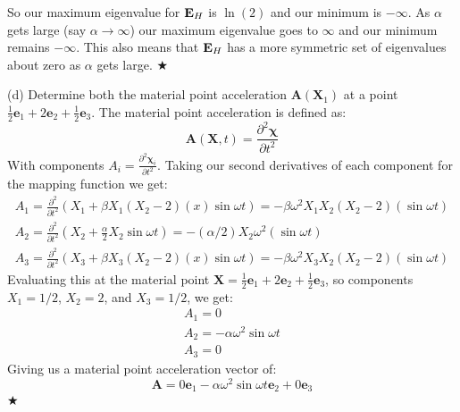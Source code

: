 So our maximum eigenvalue for $\mathbf{E}_H$ is $\ln(2)$ and our minimum is $-\infty$. As $\alpha$ gets large (say $\alpha \to \infty$) our maximum eigenvalue goes to $\infty$ and our minimum remains $-\infty$. This also means that $\mathbf{E}_H$ has a more symmetric set of eigenvalues about zero as $\alpha$ gets large.
\hspace*{\fill} $\bigstar$

\medskip
(d) Determine both the material point acceleration $\bm{A}(\bm{X}_1)$ at a point $\frac{1}{2} \bm{e}_1 + 2\bm{e}_2 + \frac{1}{2} \bm{e}_3$.  
The material point acceleration is defined as:
\begin{equation}
    \bm{A}(\bm{X},t) = \frac{\partial^2 \bm{\chi}}{\partial t^2}
\end{equation}
With components $A_i = \frac{\partial^2 \bm{\chi}_i}{\partial t^2}$.
Taking our second derivatives of each component for the mapping function we get:
\begin{equation}
\begin{split}
    A_1 = \frac{\partial^2}{\partial t^2} (X_1 + \beta X_1(X_2 - 2)(x)\sin{\omega t}) = -\beta \omega^2 X_1X_2(X_2-2)(\sin{\omega t}) \\
    A_2 = \frac{\partial^2}{\partial t^2} (X_2 + \frac{\alpha}{2}X_2 \sin{\omega t}) = -(\alpha /2)X_2\omega^2(\sin{\omega t}) \\
    A_3 = \frac{\partial^2}{\partial t^2} (X_3 + \beta X_3(X_2 - 2)(x)\sin{\omega t}) = -\beta \omega^2 X_3X_2(X_2-2)(\sin{\omega t})
\end{split}
\end{equation}
Evaluating this at the material point $\bm{X} = \frac{1}{2} \bm{e}_1 + 2\bm{e}_2 + \frac{1}{2} \bm{e}_3$, so components $X_1 = 1/2$, $X_2 = 2$, and $X_3 = 1/2$, we get:
\begin{equation}
\begin{split}
    A_1 = 0 \\
    A_2 = -\alpha \omega^2\sin{\omega t} \\
    A_3 = 0
\end{split}
\end{equation}
Giving us a material point acceleration vector of:
\begin{equation}
    \bm{A} = 0 \bm{e}_1 -\alpha \omega^2\sin{\omega t}\bm{e}_2 + 0\bm{e}_3
\end{equation}
\hspace*{\fill} $\bigstar$

% 